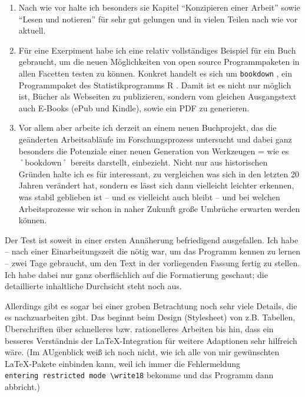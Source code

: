 \documentclass[]{book}
\providecommand{\tightlist}{%
  \setlength{\itemsep}{0pt}\setlength{\parskip}{0pt}}
\theoremstyle{definition}
\theoremstyle{definition}
\theoremstyle{definition}
\theoremstyle{remark}
\begin{document}
\begin{enumerate}
\def\labelenumi{\arabic{enumi}.}
\tightlist
\item
  Nach wie vor halte ich besonders sie Kapitel ``Konzipieren einer
  Arbeit'' sowie ``Lesen und notieren'' für sehr gut gelungen und in
  vielen Teilen nach wie vor aktuell.
\item
  Für eine Exerpiment habe ich eine relativ vollständiges Beispiel für
  ein Buch gebraucht, um die neuen Möglichkeiten von open source
  Programmpaketen in allen Facetten testen zu können. Konkret handelt es
  sich um \texttt{bookdown} \citep{Xie_2016}, ein Programmpaket des
  Statistikprogramms R \citep{R-base}. Damit ist es nicht nur möglich
  ist, Bücher als Webseiten zu publizieren, sondern vom gleichen
  Ausgangstext auch E-Books (ePub und Kindle), sowie ein PDF zu
  generieren.
\item
  Vor allem aber arbeite ich derzeit an einem neuen Buchprojekt, das die
  geänderten Arbeitsabläufe im Forschungsprozess untersucht und dabei
  ganz besonders die Potenziale einer neuen Generation von Werkzeugen =
  wie es ˚bookdown˚ bereits darstellt, einbezieht. Nicht nur aus
  historischen Gründen halte ich es für interessant, zu vergleichen was
  sich in den letzten 20 Jahren verändert hat, sondern es lässt sich
  dann vielleicht leichter erkennen, was stabil geblieben ist -- und es
  vielleicht auch bleibt -- und bei welchen Arbeitsprozesse wir schon in
  naher Zukunft große Umbrüche erwarten werden können.
\end{enumerate}

Der Test ist soweit in einer ersten Annäherung befriedigend ausgefallen.
Ich habe -- nach einer Einarbeitungszeit die nötig war, um das Programm
kennen zu lernen -- zwei Tage gebraucht, um den Text in der vorliegenden
Fassung fertig zu stellen. Ich habe dabei nur ganz oberflächlich auf die
Formatierung geschaut; die detaillierte inhaltliche Durchsicht steht
noch aus.

Allerdings gibt es sogar bei einer groben Betrachtung noch sehr viele
Details, die es nachzuarbeiten gibt. Das beginnt beim Design
(Stylesheet) von z.B. Tabellen, Überschriften über schnelleres bzw.
rationelleres Arbeiten bis hin, dass ein besseres Verständnis der
LaTeX-Integration für weitere Adaptionen sehr hilfreich wäre. (Im
AUgenblick weiß ich noch nicht, wie ich alle von mir gewünschten
LaTeX-Pakete einbinden kann, weil ich immer die Fehlermeldung
\texttt{entering\ restricted\ mode\ \textbackslash{}write18} bekomme und
das Programm dann abbricht.)
\end{document}
